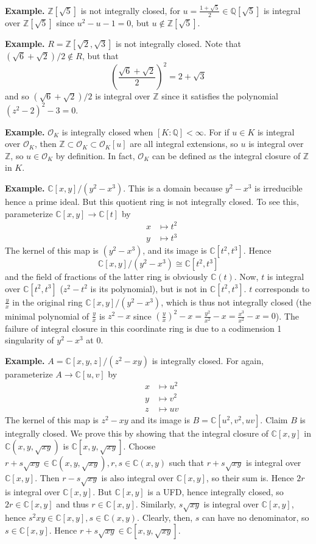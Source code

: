 \documentclass[12pt]{article}
\newcommand{\Ints}{\mathbb{Z}}
\newcommand{\Complex}{\mathbb{C}}
\newcommand{\Rats}{\mathbb{Q}}
\newcommand{\Alg}{\mathcal{O}}
\begin{document}
\textbf{Example. } $\Ints[\sqrt{5}]$ is not integrally closed, for $u=\frac{1+\sqrt{5}}{2}\in\Rats[\sqrt{5}]$ is integral over $\Ints[\sqrt{5}]$ since $u^2-u-1=0$, but $u\notin\Ints[\sqrt{5}]$.

\textbf{Example. } $R=\Ints[\sqrt{2},\sqrt{3}]$ is not integrally closed. Note that $(\sqrt{6}+\sqrt{2})/2\notin R$, but that
\[\left(\frac{\sqrt{6}+\sqrt{2}}{2}\right)^2=2+\sqrt{3}\]
and so $(\sqrt{6}+\sqrt{2})/2$ is integral over $\Ints$ since it satisfies the polynomial $(z^2-2)^2-3=0$.

\textbf{Example. } $\Alg_K$ is integrally closed when $[K:\Rats]<\infty$. For if $u\in K$ is integral over $\Alg_K$, then $\Ints\subset\Alg_K\subset \Alg_K[u]$ are all integral extensions, so $u$ is integral over $\Ints$, so $u\in\Alg_K$ by definition. In fact, $\Alg_K$ can be defined as the integral closure of $\Ints$ in $K$.

\textbf{Example. } $\Complex[x,y]/(y^2-x^3)$. This is a domain because $y^2-x^3$ is irreducible hence a prime ideal. But this quotient ring is not integrally closed. To see this, parameterize $\Complex[x,y]\rightarrow\Complex[t]$ by
\begin{eqnarray*}
&x&\mapsto t^2\\
&y&\mapsto t^3
\end{eqnarray*}
The kernel of this map is $(y^2-x^3)$, and its image is $\Complex[t^2,t^3]$. Hence
\[\Complex[x,y]/(y^2-x^3)\cong\Complex[t^2,t^3]\]
and the field of fractions of the latter ring is obviously $\Complex(t)$. Now, $t$ is integral over $\Complex[t^2,t^3]$ ($z^2-t^2$ is its polynomial), but is not in $\Complex[t^2,t^3]$. $t$ corresponds to $\frac{y}{x}$ in the original ring $\Complex[x,y]/(y^2-x^3)$, which is thus not integrally closed (the minimal polynomial of $\frac{y}{x}$ is $z^2-x$ since $(\frac{y}{x})^2-x=\frac{y^2}{x^2}-x=\frac{x^3}{x^2}-x=0$). The failure of integral closure in this coordinate ring is due to a codimension 1 singularity of $y^2-x^3$ at $0$.

\textbf{Example. } $A=\Complex[x,y,z]/(z^2-xy)$ is integrally closed. For again, parameterize $A\rightarrow \Complex[u,v]$ by
\begin{eqnarray*}
&x&\mapsto u^2\\
&y&\mapsto v^2\\
&z&\mapsto uv
\end{eqnarray*}
The kernel of this map is $z^2-xy$ and its image is $B=\Complex[u^2,v^2,uv]$. Claim $B$ is integrally closed. We prove this by showing that the integral closure of $\Complex[x,y]$ in $\Complex(x,y,\sqrt{xy})$ is $\Complex[x,y,\sqrt{xy}]$. Choose $r+s\sqrt{xy}\in\Complex(x,y,\sqrt{xy}), r,s\in\Complex(x,y)$ such that $r+s\sqrt{xy}$ is integral over $\Complex[x,y]$. Then $r-s\sqrt{xy}$ is also integral over $\Complex[x,y]$, so their sum is. Hence $2r$ is integral over $\Complex[x,y]$. But $\Complex[x,y]$ is a UFD, hence integrally closed, so $2r\in\Complex[x,y]$ and thus $r\in\Complex[x,y]$. Similarly, $s\sqrt{xy}$ is integral over $\Complex[x,y]$, hence $s^2xy\in\Complex[x,y], s\in\Complex(x,y)$. Clearly, then, $s$ can have no denominator, so $s\in\Complex[x,y]$. Hence $r+s\sqrt{xy}\in\Complex[x,y,\sqrt{xy}]$.

\end{document}
